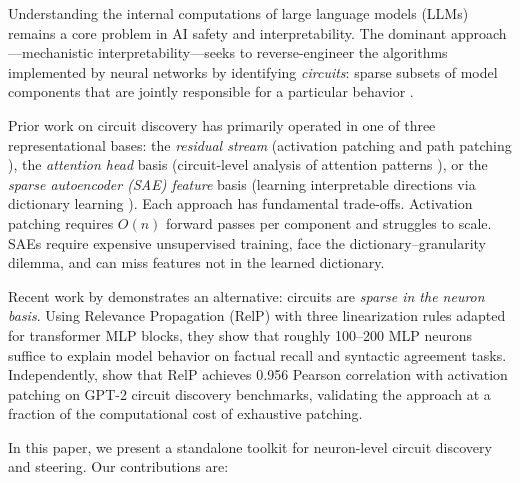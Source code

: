 \documentclass[11pt]{article}
\begin{document}
Understanding the internal computations of large language models (LLMs) remains a core problem in AI safety and interpretability.
The dominant approach---mechanistic interpretability---seeks to reverse-engineer the algorithms implemented by neural networks by identifying \emph{circuits}: sparse subsets of model components that are jointly responsible for a particular behavior \citep{conmy2023acdc, wang2023ioi, elhage2022toy}.

Prior work on circuit discovery has primarily operated in one of three representational bases: the \emph{residual stream} (activation patching and path patching \citep{meng2022rome, goldowskydill2023localizing}), the \emph{attention head} basis (circuit-level analysis of attention patterns \citep{wang2023ioi}), or the \emph{sparse autoencoder (SAE) feature} basis (learning interpretable directions via dictionary learning \citep{cunningham2023sae, bricken2023monosemanticity, templeton2024scaling, marks2024sparse}).
Each approach has fundamental trade-offs.
Activation patching requires $O(n)$ forward passes per component and struggles to scale.
SAEs require expensive unsupervised training, face the dictionary--granularity dilemma, and can miss features not in the learned dictionary.

Recent work by \citet{arora2025circuits} demonstrates an alternative: circuits are \emph{sparse in the neuron basis}.
Using Relevance Propagation (RelP) \citep{achtibat2024relp, bach2015pixel} with three linearization rules adapted for transformer MLP blocks, they show that roughly 100--200 MLP neurons suffice to explain model behavior on factual recall and syntactic agreement tasks.
Independently, \citet{jafari2025relp} show that RelP achieves 0.956 Pearson correlation with activation patching on GPT-2 circuit discovery benchmarks, validating the approach at a fraction of the computational cost of exhaustive patching.

In this paper, we present a standalone toolkit for neuron-level circuit discovery and steering.
Our contributions are:
\end{document}
